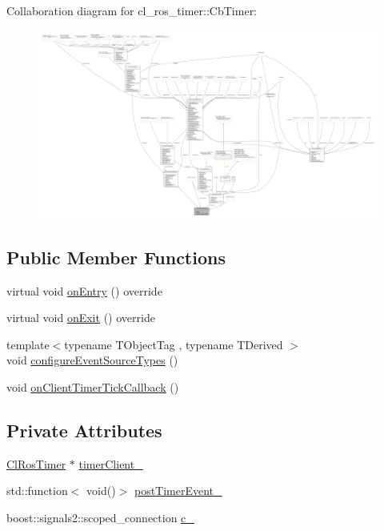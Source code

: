 Collaboration diagram for cl\+\_\+ros\+\_\+timer\+:\+:Cb\+Timer\+:
\nopagebreak
\begin{figure}[H]
\begin{center}
\leavevmode
\includegraphics[width=350pt]{classcl__ros__timer_1_1CbTimer__coll__graph}
\end{center}
\end{figure}
\subsection*{Public Member Functions}
\begin{DoxyCompactItemize}
\item 
virtual void \hyperlink{classcl__ros__timer_1_1CbTimer_aceba45e86271cf1b7333e2f42c246a38}{on\+Entry} () override
\item 
virtual void \hyperlink{classcl__ros__timer_1_1CbTimer_a04184e2679c32363c876e1d6b4746072}{on\+Exit} () override
\item 
{\footnotesize template$<$typename T\+Object\+Tag , typename T\+Derived $>$ }\\void \hyperlink{classcl__ros__timer_1_1CbTimer_a09267b38fed9b6db637eba8b2f789d1c}{configure\+Event\+Source\+Types} ()
\item 
void \hyperlink{classcl__ros__timer_1_1CbTimer_a9895eb7e05a5922fa27f2bc46f5486a0}{on\+Client\+Timer\+Tick\+Callback} ()
\end{DoxyCompactItemize}
\subsection*{Private Attributes}
\begin{DoxyCompactItemize}
\item 
\hyperlink{classcl__ros__timer_1_1ClRosTimer}{Cl\+Ros\+Timer} $\ast$ \hyperlink{classcl__ros__timer_1_1CbTimer_aefff167dbfbc54485f700a2c6b2479a5}{timer\+Client\+\_\+}
\item 
std\+::function$<$ void()$>$ \hyperlink{classcl__ros__timer_1_1CbTimer_ad2b7913a84459d635fdcca8d346c7af2}{post\+Timer\+Event\+\_\+}
\item 
boost\+::signals2\+::scoped\+\_\+connection \hyperlink{classcl__ros__timer_1_1CbTimer_a2713f692e11ee82ea55080938d339881}{c\+\_\+}
\end{DoxyCompactItemize}


